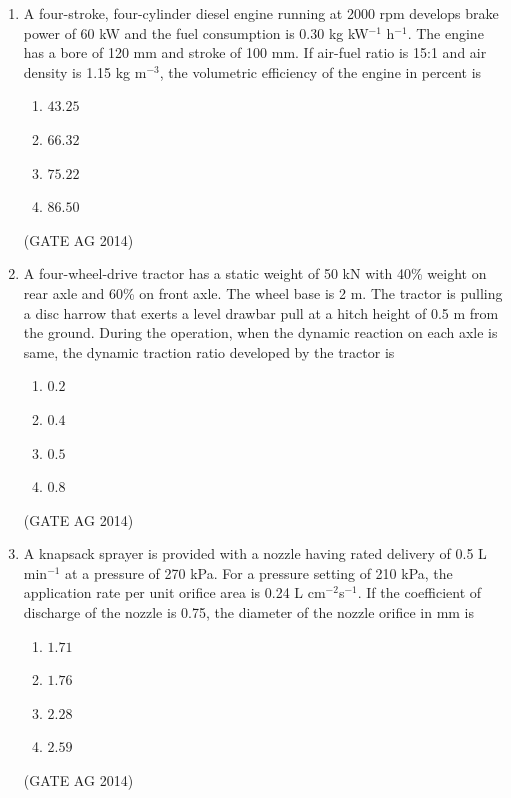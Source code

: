 \documentclass[journal,12pt,onecolumn]{IEEEtran}
\begin{document}
\begin{enumerate}
    \item A four-stroke, four-cylinder diesel engine running at 2000 rpm develops brake power of 60 kW and the fuel consumption is 0.30 kg kW$^{-1}$ h$^{-1}$. The engine has a bore of 120 mm and stroke of 100 mm. If air-fuel ratio is 15:1 and air density is 1.15 kg m$^{-3}$, the volumetric efficiency of the engine in percent is
    \begin{multicols}{4}
    \begin{enumerate}
        \item  $43.25$
        \item $66.32$
        \item $75.22$
        \item $86.50$
    \end{enumerate}
    \end{multicols}
    
    \hfill(GATE AG 2014)

    \item A four-wheel-drive tractor has a static weight of 50 kN with 40\% weight on rear axle and 60\% on front axle. The wheel base is 2 m. The tractor is pulling a disc harrow that exerts a level drawbar pull at a hitch height of 0.5 m from the ground. During the operation, when the dynamic reaction on each axle is same, the dynamic traction ratio developed by the tractor is
     \begin{multicols}{4}
    \begin{enumerate}
        \item $0.2$
        \item $0.4$
        \item $0.5$
        \item $0.8$
    \end{enumerate}
    \end{multicols}
    \hfill(GATE AG 2014)

    \item A knapsack sprayer is provided with a nozzle having rated delivery of 0.5 L min$^{-1}$ at a pressure of 270 kPa. For a pressure setting of 210 kPa, the application rate per unit orifice area is 0.24 L cm$^{-2}$s$^{-1}$. If the coefficient of discharge of the nozzle is 0.75, the diameter of the nozzle orifice in mm is
   \begin{multicols}{4}   
    \begin{enumerate}
        \item $1.71$
        \item $1.76$
        \item $2.28$
        \item $2.59$
    \end{enumerate}
     \end{multicols}
    \hfill(GATE AG 2014)


\end{enumerate}
\end{document}
